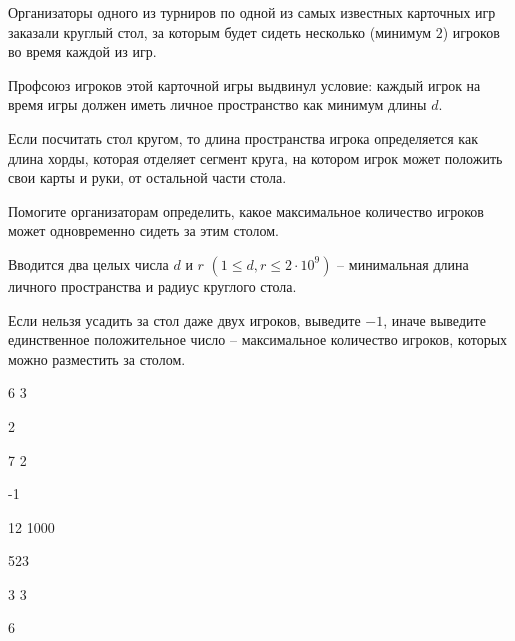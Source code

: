 
Организаторы одного из турниров по одной из самых известных карточных игр заказали круглый стол, за которым будет сидеть несколько (минимум $2$) игроков во время каждой из игр.

Профсоюз игроков этой карточной игры выдвинул условие: каждый игрок на время игры должен иметь личное пространство как минимум длины $d$.

Если посчитать стол кругом, то длина пространства игрока определяется как длина хорды, которая отделяет сегмент круга, на котором игрок может положить свои карты и руки, от остальной части стола.

Помогите организаторам определить, какое максимальное количество игроков может одновременно сидеть за этим столом.


Вводится два целых числа $d$ и $r$ $(1 \le d, r \le 2 \cdot 10^{9})$ -- минимальная длина личного пространства и радиус круглого стола.

\outputfmtSection

Если нельзя усадить за стол даже двух игроков, выведите $-1$, иначе выведите единственное положительное число -- максимальное количество игроков, которых можно разместить за столом.

\exampleSection


\begin{myverbbox}[\small]{\vinput}
6 3
\end{myverbbox}
\begin{myverbbox}[\small]{\voutput}
2
\end{myverbbox}


\begin{myverbbox}[\small]{\vinput}
7 2
\end{myverbbox}
\begin{myverbbox}[\small]{\voutput}
-1
\end{myverbbox}


\begin{myverbbox}[\small]{\vinput}
12 1000
\end{myverbbox}
\begin{myverbbox}[\small]{\voutput}
523
\end{myverbbox}


\begin{myverbbox}[\small]{\vinput}
3 3
\end{myverbbox}
\begin{myverbbox}[\small]{\voutput}
6
\end{myverbbox}

